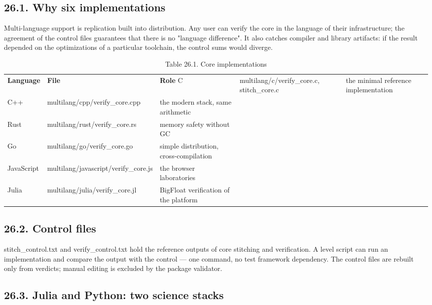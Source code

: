 \documentclass[11pt,a4paper]{article}
\begin{document}
\subsection{26.1. Why six implementations}

Multi-language support is replication built into distribution. Any user can verify the core in the language of their infrastructure; the agreement of the control files guarantees that there is no "language difference". It also catches compiler and library artifacts: if the result depended on the optimizations of a particular toolchain, the control sums would diverge.

\begin{table}[htbp]\centering\small
\caption{Table 26.1. Core implementations}
\begin{tabular}{p{} p{} p{}}
\toprule
\textbf{Language} & \textbf{File} & \textbf{Role}
\midrule
C & multilang/c/verify\_core.c, stitch\_core.c & the minimal reference implementation \\
C++ & multilang/cpp/verify\_core.cpp & the modern stack, same arithmetic \\
Rust & multilang/rust/verify\_core.rs & memory safety without GC \\
Go & multilang/go/verify\_core.go & simple distribution, cross-compilation \\
JavaScript & multilang/javascript/verify\_core.js & the browser laboratories \\
Julia & multilang/julia/verify\_core.jl & BigFloat verification of the platform \\
\bottomrule
\end{tabular}
\end{table}

\subsection{26.2. Control files}

stitch\_control.txt and verify\_control.txt hold the reference outputs of core stitching and verification. A level script can run an implementation and compare the output with the control — one command, no test framework dependency. The control files are rebuilt only from verdicts; manual editing is excluded by the package validator.

\subsection{26.3. Julia and Python: two science stacks}
\end{document}
